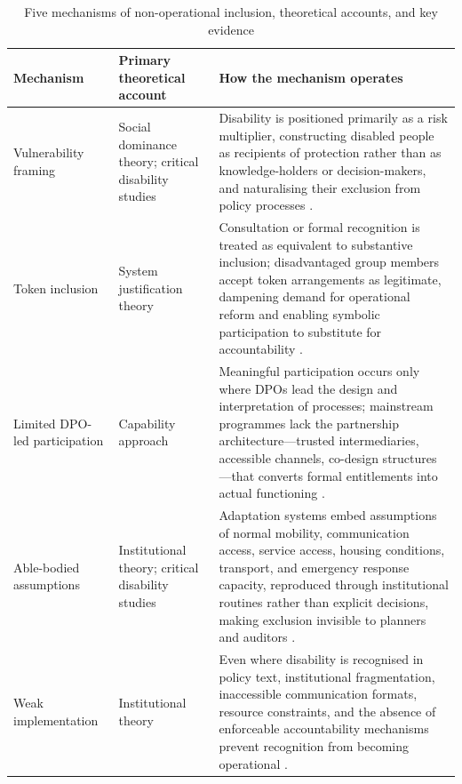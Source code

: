 \documentclass[12pt,a4paper]{article}
\begin{document}
\begin{table}[H]
\centering
\small
\renewcommand{\arraystretch}{1.3}
\caption{Five mechanisms of non-operational inclusion, theoretical accounts, and key evidence}
\label{tab:mechanisms}
\begin{tabularx}{\textwidth}{
>{\raggedright\arraybackslash}p{}
>{\raggedright\arraybackslash}p{}
>{\raggedright\arraybackslash}X
}
\toprule
\textbf{Mechanism} & \textbf{Primary theoretical account} & \textbf{How the mechanism operates} \\
\midrule
Vulnerability framing
& Social dominance theory; critical disability studies
& Disability is positioned primarily as a risk multiplier, constructing disabled people as recipients of protection rather than as knowledge-holders or decision-makers, and naturalising their exclusion from policy processes \cite{sidanius_pratto_1999_socdom,oliver_1990_politics,sheknoble2023communicating,Harpur2025}. \\
\midrule
Token inclusion
& System justification theory
& Consultation or formal recognition is treated as equivalent to substantive inclusion; disadvantaged group members accept token arrangements as legitimate, dampening demand for operational reform and enabling symbolic participation to substitute for accountability \cite{jost_2003_decade,Akike2025,setijaningrum2024tokenism,bennettgayle2020sendai}. \\
\midrule
Limited DPO-led participation
& Capability approach
& Meaningful participation occurs only where DPOs lead the design and interpretation of processes; mainstream programmes lack the partnership architecture---trusted intermediaries, accessible channels, co-design structures---that converts formal entitlements into actual functioning \cite{sen_1999_development,pertiwi2019dpo,villeneuve2017dpo,ton2021agency,rahatiningtyas2025yogyakarta}. \\
\midrule
Able-bodied assumptions
& Institutional theory; critical disability studies
& Adaptation systems embed assumptions of normal mobility, communication access, service access, housing conditions, transport, and emergency response capacity, reproduced through institutional routines rather than explicit decisions, making exclusion invisible to planners and auditors \cite{dimaggio_powell_1983_ironcage,oliver_1990_politics,lunga2019zimbabwe,gershon2021fema,brown2025massachusetts}. \\
\midrule
Weak implementation
& Institutional theory
& Even where disability is recognised in policy text, institutional fragmentation, inaccessible communication formats, resource constraints, and the absence of enforceable accountability mechanisms prevent recognition from becoming operational \cite{dimaggio_powell_1983_ironcage,devkota2023nepal,pertiwi2020indonesia,islam2015bangladesh,Brunne2025}. \\
\bottomrule
\end{tabularx}
\end{table}
\end{document}
